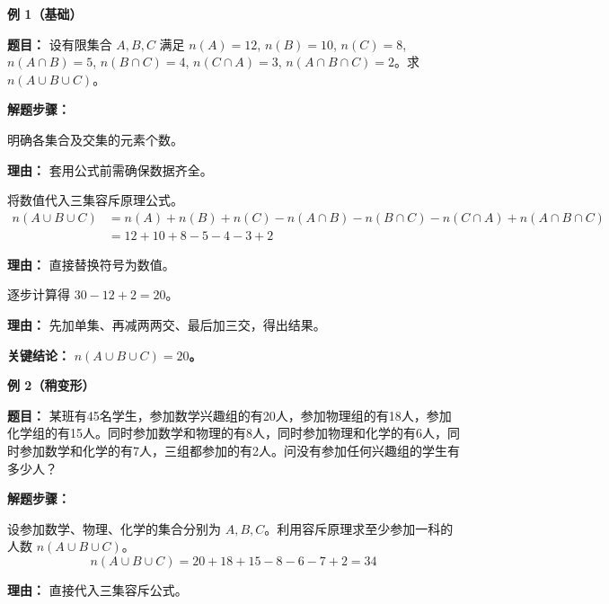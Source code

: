 \begin{examplebox}
	\textbf{\textcolor{CExample}{例 1（基础）}}

	\textbf{\textcolor{CExample}{题目：}}
	设有限集合 $A,B,C$ 满足 $n(A)=12$, $n(B)=10$, $n(C)=8$, $n(A\cap B)=5$, $n(B\cap C)=4$, $n(C\cap A)=3$, $n(A\cap B\cap C)=2$。求 $n(A\cup B\cup C)$。

	\textbf{\textcolor{CExample}{解题步骤：}}
	\begin{description}[style=nextline, leftmargin=2.8em, labelsep=0.5em, itemsep=0.45em]
		\item[\textbf{第一步（列出已知）：}] 明确各集合及交集的元素个数。
			\par\textbf{理由：} 套用公式前需确保数据齐全。

		\item[\textbf{第二步（代入公式）：}] 将数值代入三集容斥原理公式。
			\[
				\begin{aligned}
					n(A\cup B\cup C) &= n(A)+n(B)+n(C) - n(A\cap B) - n(B\cap C) - n(C\cap A) + n(A\cap B\cap C)\\
					&= 12+10+8 - 5 - 4 - 3 + 2
			\end{aligned}
			\]
			\par\textbf{理由：} 直接替换符号为数值。

		\item[\textbf{第三步（计算结果）：}] 逐步计算得 $30 - 12 + 2 = 20$。
			\par\textbf{理由：} 先加单集、再减两两交、最后加三交，得出结果。
	\end{description}

	\textbf{\textcolor{CExample}{关键结论：}}
	\textbf{$n(A\cup B\cup C)=20$。}

	\medskip
	\textbf{\textcolor{CExample}{例 2（稍变形）}}

	\textbf{\textcolor{CExample}{题目：}}
	某班有45名学生，参加数学兴趣组的有20人，参加物理组的有18人，参加化学组的有15人。同时参加数学和物理的有8人，同时参加物理和化学的有6人，同时参加数学和化学的有7人，三组都参加的有2人。问没有参加任何兴趣组的学生有多少人？

	\textbf{\textcolor{CExample}{解题步骤：}}
	\begin{description}[style=nextline, leftmargin=2.8em, labelsep=0.5em, itemsep=0.45em]
		\item[\textbf{第一步（求并集人数）：}] 设参加数学、物理、化学的集合分别为 $A,B,C$。利用容斥原理求至少参加一科的人数 $n(A\cup B\cup C)$。
			\[
				n(A\cup B\cup C) = 20+18+15 - 8 - 6 - 7 + 2 = 34
			\]
			\par\textbf{理由：} 直接代入三集容斥公式。


\end{description}
\end{examplebox}
